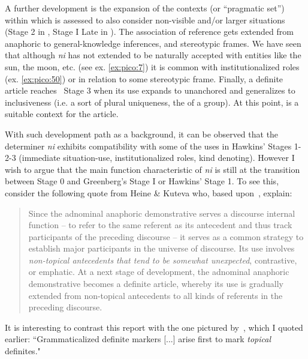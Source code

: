 \documentclass[output=paper
,modfonts
,nonflat]{langsci/langscibook}
\begin{document}
A further development is the expansion of the contexts (or ``pragmatic set'') within which  is assessed to also consider non-visible and/or larger situations (Stage 2 in \citealt{Hawkins2004}, Stage I Late in \citealt{Greenberg1978howgender}). The association of reference gets extended from anaphoric to general-knowledge inferences, and stereotypic frames. We have seen that although \textit{ni} has not extended to be naturally accepted with entities like the sun, the moon, etc. (see ex. \ref{ex:pico:7}) it is common with institutionalized roles (ex. \ref{ex:pico:50}) or in relation to some stereotypic frame. 
Finally, a definite article reaches~ Stage 3 when its use expands to unanchored  and generalizes to inclusiveness (i.e. a sort of plural uniqueness, the  of a group). At this point,  is a suitable context for the article.

With such development path as a background, it can be observed that the determiner \textit{ni} exhibits compatibility with some of the uses in Hawkins' Stages 1-2-3 (immediate situation-use, institutionalized roles, kind denoting). 
However I wish to argue that the main function characteristic of \textit{ni} is still at the transition between Stage 0 and Greenberg's Stage I or Hawkins' Stage 1. To see this, consider the following quote from Heine \& Kuteva who, based upon~\citet[][96, 128-129]{Diessel1999}, explain:

\begin{quotation}
	Since the adnominal anaphoric demonstrative serves a discourse internal function -- to refer to the same referent as its antecedent and thus track participants of the preceding discourse -- it serves as a common strategy to establish major participants in the universe of discourse. Its use involves \textit{non-topical antecedents that tend to be somewhat unexpected}, contrastive, or emphatic. At a next stage of development, the adnominal anaphoric demonstrative becomes a definite article, whereby its use is gradually extended from non-topical antecedents to all kinds of referents in the preceding discourse. \citep[101--102, emphasis mine]{HeineKuteva2006}
\end{quotation}


It is interesting to contrast this report with the one pictured by~\citet[474]{Givon2001}, which I quoted earlier: ``Grammaticalized definite markers [...] arise first to mark \textit{topical} definites."
\end{document}
